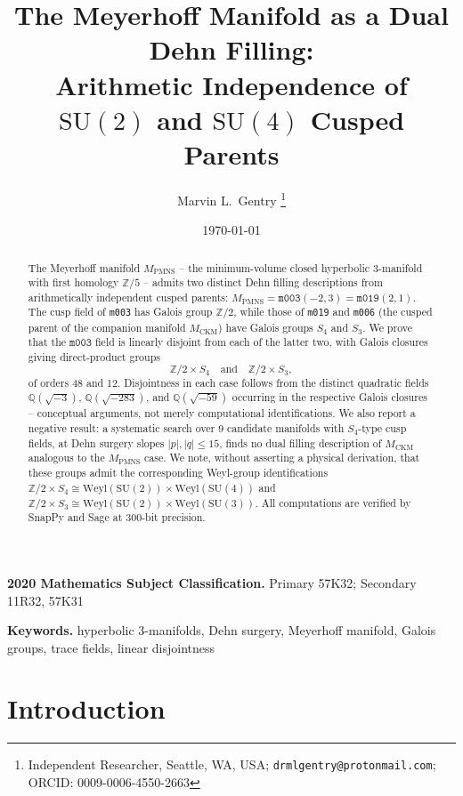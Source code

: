 \documentclass[11pt,a4paper]{article}
\theoremstyle{definition}
\theoremstyle{remark}
\newcommand{\Z}{\mathbb{Z}}
\newcommand{\Q}{\mathbb{Q}}
\newcommand{\mfld}[1]{\texttt{#1}}
\newcommand{\SU}{\mathrm{SU}}
\newcommand{\Weyl}{\mathrm{Weyl}}
\newcommand{\subjclass}[2][2020]{\par\noindent\textbf{#1 Mathematics Subject Classification.} #2\par}
\newcommand{\keywords}[1]{\par\noindent\textbf{Keywords.} #1\par}
\begin{document}
\title{The Meyerhoff Manifold as a Dual Dehn Filling:\\
Arithmetic Independence of $\SU(2)$ and $\SU(4)$ Cusped Parents}

\author{Marvin L.~Gentry%
\thanks{Independent Researcher, Seattle, WA, USA;
\texttt{drmlgentry@protonmail.com};
ORCID: 0009-0006-4550-2663}}
\date{\today}
\maketitle

\begin{abstract}
The Meyerhoff manifold $M_{\mathrm{PMNS}}$ -- the minimum-volume
closed hyperbolic 3-manifold with first homology $\Z/5$ -- admits
two distinct Dehn filling descriptions from arithmetically
independent cusped parents: $M_{\mathrm{PMNS}} = \mfld{m003}(-2,3)
= \mfld{m019}(2,1)$. The cusp field of \mfld{m003} has Galois group
$\Z/2$, while those of \mfld{m019} and \mfld{m006} (the cusped
parent of the companion manifold $M_{\mathrm{CKM}}$) have Galois
groups $S_4$ and $S_3$. We prove that the $\mfld{m003}$ field is
linearly disjoint from each of the latter two, with Galois closures
giving direct-product groups
\[
\Z/2\times S_4 \quad\text{and}\quad \Z/2\times S_3,
\]
of orders 48 and 12. Disjointness in each case follows from the
distinct quadratic fields $\Q(\sqrt{-3})$, $\Q(\sqrt{-283})$, and
$\Q(\sqrt{-59})$ occurring in the respective Galois closures --
conceptual arguments, not merely computational identifications. We
also report a negative result: a systematic search over 9 candidate
manifolds with $S_4$-type cusp fields, at Dehn surgery slopes
$|p|,|q|\le 15$, finds no dual filling description of
$M_{\mathrm{CKM}}$ analogous to the $M_{\mathrm{PMNS}}$ case. We
note, without asserting a physical derivation, that these groups
admit the corresponding Weyl-group identifications
$\Z/2\times S_4\cong\Weyl(\SU(2))\times\Weyl(\SU(4))$ and
$\Z/2\times S_3\cong\Weyl(\SU(2))\times\Weyl(\SU(3))$.
All computations are verified by SnapPy and Sage at 300-bit
precision.
\end{abstract}

\subjclass[2020]{Primary 57K32; Secondary 11R32, 57K31}

\keywords{hyperbolic 3-manifolds, Dehn surgery, Meyerhoff manifold,
Galois groups, trace fields, linear disjointness}

\section{Introduction}
\end{document}
